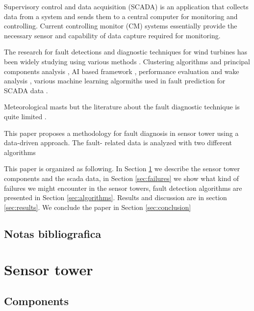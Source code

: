 \documentclass[journal]{IEEEtran}
\begin{document}
Supervisory control and data acquisition (SCADA) is an application that collects data from a system and sends them to a central computer for monitoring and controlling. Current controlling monitor (CM) systems essentially provide the necessary sensor and capability of data capture required for monitoring.

The research for  fault detections and diagnostic techniques for wind turbines has been widely studying using various methods \cite{tchakoua2014wind,wymore2015survey}. 
Clustering algorithms and principal components analysis \cite{kim2011use}, AI based framework \cite{wang2014scada}, performance evaluation and wake analysis \cite{astolfi2016mathematical}, various machine learning algormiths used in fault prediction for SCADA data \cite{kusiak2011prediction}.

Meteorological masts  
but the literature about the fault diagnostic technique is quite limited \cite{hasu2006weather} .


This paper proposes a methodology for fault diagnosis in sensor tower using a data-driven approach. The fault- related data is analyzed with two different algorithms

This paper is organized as following. In Section \ref{sec:sensortower} we describe the sensor tower components and the scada data, in Section \ref{sec:failures} we show what kind of failures we might encounter in the sensor towers, fault detection algorithms are presented in Section \ref{sec:algorithms}. Results and discussion are in section \ref{sec:results}. We conclude the paper in Section \ref{sec:conclusion}


\subsection{Notas bibliografica}





\cite{lu2009review}

\cite{schlechtingen2012condition}

\cite{schlechtingen2011comparative}

\cite{yang2014wind}




\section{Sensor tower}\label{sec:sensortower}
\subsection{Components}
\end{document}
